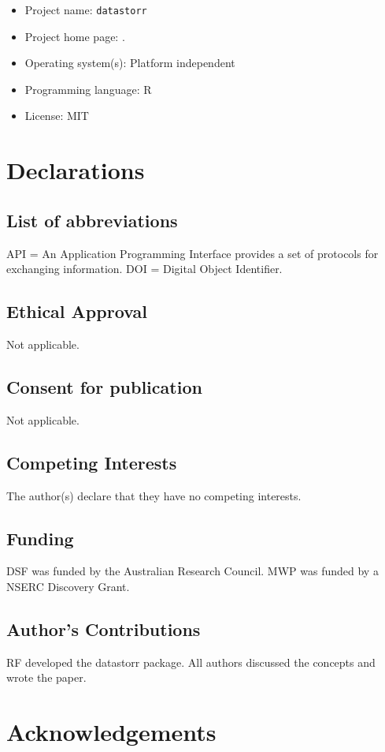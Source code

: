 \documentclass[a4paper,num-refs]{assets/oup-contemporary}
\begin{document}
\begin{itemize}
\item Project name:  \texttt{datastorr} 
\item Project home page: .
\item Operating system(s): Platform independent
\item Programming language: R
\item License: MIT
\end{itemize}

\section{Declarations}

\subsection{List of abbreviations}
API = An Application Programming Interface provides a set of protocols for exchanging information. DOI = Digital Object Identifier.

\subsection{Ethical Approval}
Not applicable.

\subsection{Consent for publication}
Not applicable.
\subsection{Competing Interests}
The author(s) declare that they have no competing interests. 

\subsection{Funding}

DSF was funded by the Australian Research Council. MWP was funded by a NSERC Discovery Grant.

\subsection{Author's Contributions}
RF developed the datastorr package. All authors discussed the concepts and wrote the paper. 

\section{Acknowledgements}
\end{document}
